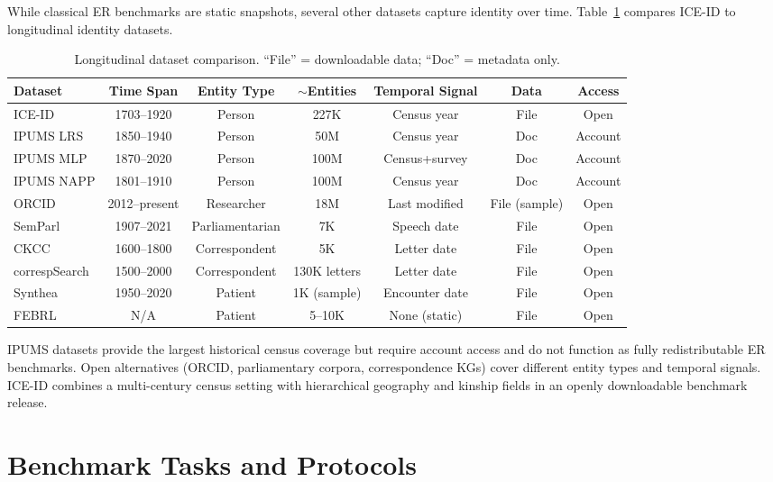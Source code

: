 \documentclass{article}
\begin{document}
While classical ER benchmarks are static snapshots, several other datasets capture identity over time. Table~\ref{tab:longitudinal} compares ICE-ID to longitudinal identity datasets.

\begin{table}[ht]
  \centering
  \caption{Longitudinal dataset comparison. ``File'' = downloadable data; ``Doc'' = metadata only.}
  \label{tab:longitudinal}
  \scriptsize
  \begin{tabular}{lcccccc}
    \toprule
    \textbf{Dataset} & \textbf{Time Span} & \textbf{Entity Type} & \textbf{$\sim$Entities} & \textbf{Temporal Signal} & \textbf{Data} & \textbf{Access} \\
    \midrule
    ICE-ID & 1703--1920 & Person & 227K & Census year & File & Open \\
    IPUMS LRS & 1850--1940 & Person & 50M & Census year & Doc & Account \\
    IPUMS MLP & 1870--2020 & Person & 100M & Census+survey & Doc & Account \\
    IPUMS NAPP & 1801--1910 & Person & 100M & Census year & Doc & Account \\
    ORCID & 2012--present & Researcher & 18M & Last modified & File (sample) & Open \\
    SemParl & 1907--2021 & Parliamentarian & 7K & Speech date & File & Open \\
    CKCC & 1600--1800 & Correspondent & 5K & Letter date & File & Open \\
    correspSearch & 1500--2000 & Correspondent & 130K letters & Letter date & File & Open \\
    Synthea & 1950--2020 & Patient & 1K (sample) & Encounter date & File & Open \\
    FEBRL & N/A & Patient & 5--10K & None (static) & File & Open \\
    \bottomrule
  \end{tabular}
\end{table}

 IPUMS datasets provide the largest historical census coverage but require account access and do not function as fully redistributable ER benchmarks. Open alternatives (ORCID, parliamentary corpora, correspondence KGs) cover different entity types and temporal signals. ICE-ID combines a multi-century census setting with hierarchical geography and kinship fields in an openly downloadable benchmark release.

\section{Benchmark Tasks and Protocols}
\label{sec:tasks}
\end{document}

